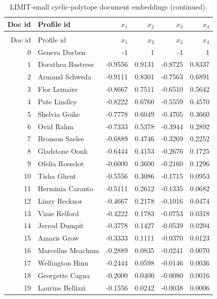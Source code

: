 {\scriptsize
\setlength{\tabcolsep}{3pt}
\begin{longtable}{@{}r l r r r r@{}}
\caption{LIMIT-small cyclic-polytope document embeddings in $[-1,1]^4$.}\label{tab:limit-small-cyclic-doc-embeddings}\\
\toprule
Doc id & Profile id & $x_1$ & $x_2$ & $x_3$ & $x_4$ \\
\midrule
\endfirsthead
\caption[]{LIMIT-small cyclic-polytope document embeddings (continued).}\\
\toprule
Doc id & Profile id & $x_1$ & $x_2$ & $x_3$ & $x_4$ \\
\midrule
\endhead
0 & Geneva Durben & -1 & 1 & -1 & 1 \\
1 & Dorathea Bastress & -0.9556 & 0.9131 & -0.8725 & 0.8337 \\
2 & Armand Schweda & -0.9111 & 0.8301 & -0.7563 & 0.6891 \\
3 & Flor Lemaire & -0.8667 & 0.7511 & -0.6510 & 0.5642 \\
4 & Pate Lindley & -0.8222 & 0.6760 & -0.5559 & 0.4570 \\
5 & Shelvia Goike & -0.7778 & 0.6049 & -0.4705 & 0.3660 \\
6 & Ovid Rahm & -0.7333 & 0.5378 & -0.3944 & 0.2892 \\
7 & Bronson Saelee & -0.6889 & 0.4746 & -0.3269 & 0.2252 \\
8 & Gladstone Oonk & -0.6444 & 0.4153 & -0.2676 & 0.1725 \\
9 & Ofelia Rosselot & -0.6000 & 0.3600 & -0.2160 & 0.1296 \\
10 & Tisha Ghent & -0.5556 & 0.3086 & -0.1715 & 0.0953 \\
11 & Herminia Caranto & -0.5111 & 0.2612 & -0.1335 & 0.0682 \\
12 & Linzy Recknor & -0.4667 & 0.2178 & -0.1016 & 0.0474 \\
13 & Vinie Relford & -0.4222 & 0.1783 & -0.0753 & 0.0318 \\
14 & Jerrod Dumpit & -0.3778 & 0.1427 & -0.0539 & 0.0204 \\
15 & Amaris Grow & -0.3333 & 0.1111 & -0.0370 & 0.0123 \\
16 & Marcellus Meachum & -0.2889 & 0.0835 & -0.0241 & 0.0070 \\
17 & Wellington Hinn & -0.2444 & 0.0598 & -0.0146 & 0.0036 \\
18 & Georgette Cagna & -0.2000 & 0.0400 & -0.0080 & 0.0016 \\
19 & Laurine Bellizzi & -0.1556 & 0.0242 & -0.0038 & 0.0006 \\

\end{longtable}}
